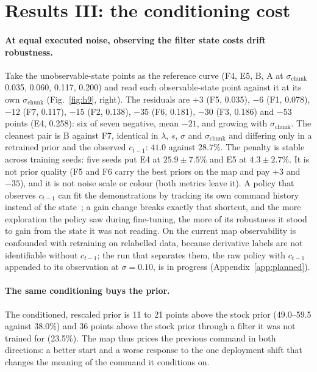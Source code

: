 \documentclass{article}
\newcommand{\schunk}{\sigma_{\mathrm{chunk}}}
\begin{document}
\section{Results III: the conditioning cost}
\label{sec:cond}

\paragraph{At equal executed noise, observing the filter state costs drift robustness.} Take the unobservable-state points as the reference curve (F4, E5, B, A at $\schunk$ 0.035, 0.060, 0.117, 0.200) and read each observable-state point against it at its own $\schunk$ (Fig.~\ref{fig:h9}, right). The residuals are $+3$ (F5, 0.035), $-6$ (F1, 0.078), $-12$ (F7, 0.117), $-15$ (F2, 0.138), $-35$ (F6, 0.181), $-30$ (F3, 0.186) and $-53$ points (E4, 0.258): six of seven negative, mean $-21$, and growing with $\schunk$. The cleanest pair is B against F7, identical in $\lambda$, $s$, $\sigma$ and $\schunk$ and differing only in a retrained prior and the observed $c_{t-1}$: $41.0$ against $28.7\%$. The penalty is stable across training seeds: five seeds put E4 at $25.9\pm7.5\%$ and E5 at $4.3\pm2.7\%$. It is not prior quality (F5 and F6 carry the best priors on the map and pay $+3$ and $-35$), and it is not noise scale or colour (both metrics leave it). A policy that observes $c_{t-1}$ can fit the demonstrations by tracking its own command history instead of the state~\citep{wen2020copycat}; a gain change breaks exactly that shortcut, and the more exploration the policy saw during fine-tuning, the more of its robustness it stood to gain from the state it was not reading. On the current map observability is confounded with retraining on relabelled data, because derivative labels are not identifiable without $c_{t-1}$; the run that separates them, the raw policy with $c_{t-1}$ appended to its observation at $\sigma=0.10$, is in progress (Appendix~\ref{app:planned}).

\paragraph{The same conditioning buys the prior.} The conditioned, rescaled prior is 11 to 21 points above the stock prior (49.0--59.5 against 38.0\%) and 36 points above the stock prior through a filter it was not trained for (23.5\%). The map thus prices the previous command in both directions: a better start and a worse response to the one deployment shift that changes the meaning of the command it conditions on.
\end{document}
